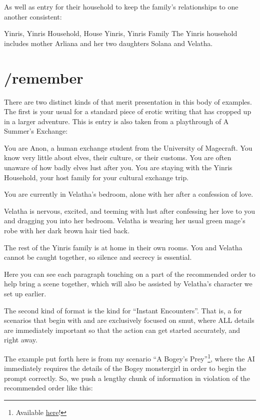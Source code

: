 \documentclass[Coomer-main.tex]{subfiles}
\begin{document}
As well as \wi entry for their household to keep the family’s relationships to one another consistent:

\begin{WI}{Yinris, Yinris Household, House Yinris, Yinris Family}
The Yinris household includes mother Arliana and her two daughters Solana and Velatha.
\end{WI}

\section{/remember}
\label{appendix:/remember}

There are two distinct kinds of \rem that merit presentation in this body of examples.
The first is your usual \rem for a standard piece of erotic writing that has cropped up in a larger adventure.
This is entry is also taken from a playthrough of A Summer’s Exchange:

\begin{/rm}
You are Anon, a human exchange student from the University of Magecraft.
You know very little about elves, their culture, or their customs.
You are often unaware of how badly elves lust after you.
You are staying with the Yinris Household, your host family for your cultural exchange trip.
\bigskip

You are currently in Velatha’s bedroom, alone with her after a confession of love.
\bigskip

Velatha is nervous, excited, and teeming with lust after confessing her love to you and dragging you into her bedroom.
Velatha is wearing her usual green mage’s robe with her dark brown hair tied back.
\bigskip

The rest of the Yinris family is at home in their own rooms.
You and Velatha cannot be caught together, so silence and secrecy is essential.
\end{/rm}

Here you can see each paragraph touching on a part of the recommended order to help bring a scene together, which will also be assisted by Velatha’s character \wi we set up earlier.

The second kind of \rem format is the kind for “Instant Encounters”.
That is, a \rem for scenarios that begin with and are exclusively focused on smut, where ALL details are immediately important so that the action can get started accurately, and right away.

The example put forth here is from my scenario “A Bogey’s Prey”\footnote{Available \href{https://play.aidungeon.io/main/scenarioView?publicId=a223b5c1-383a-11eb-bd76-6167ed773e5f}{here}!}, where the AI immediately requires the details of the Bogey monstergirl in order to begin the prompt correctly.
So, we push a lengthy chunk of information in violation of the recommended order like this:
\end{document}
